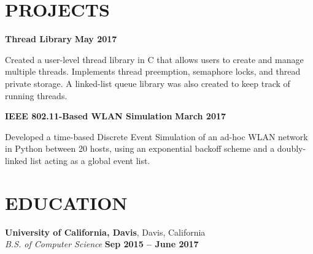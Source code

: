 \documentclass[margin,line,11pt]{resume}
\begin{document}
\begin{resume}
\sectionline

    \section{\mysidestyle \textbf{\large{P}\small{ROJECTS}}}
    \textbf{\listing Thread Library} \hfill \textbf{May 2017}\\
    \begin{list2}
        \item Created a user-level thread library in C that allows users to create and manage multiple threads. Implements thread preemption, semaphore locks, and thread private storage. A linked-list queue library was also created to keep track of running threads.
    \end{list2}

    \textbf{\listing IEEE 802.11-Based WLAN Simulation} \hfill \textbf{March 2017}\\
    \begin{list2}
        \item Developed a time-based Discrete Event Simulation of an ad-hoc WLAN network in Python between 20 hosts, using an exponential backoff scheme and a doubly-linked list acting as a global event list.
    \end{list2}

\sectionline

    \section{\mysidestyle \textbf{\large{E}\small{DUCATION}}}

    \textbf{\listing University of California, Davis}, Davis, California \vspace{2mm}\\\vspace{1mm}%
    \textsl{B.S. of Computer Science} \hfill \textbf{ Sep 2015 -- June 2017}\vspace{-3mm}\\\vspace{-1mm}%


\end{resume}
\end{document}
